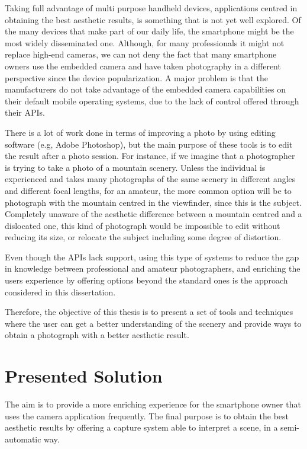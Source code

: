 Taking full advantage of multi purpose handheld devices, applications centred in obtaining the best aesthetic results, is something that is not yet well explored. 
Of the many devices that make part of our daily life, the smartphone might be the most widely disseminated one. Although, for many professionals it might not replace high-end cameras, we can not deny the fact that many smartphone owners use the embedded camera and have taken photography in a different perspective since the device popularization. A major problem is that the manufacturers do not take advantage of the embedded camera capabilities on their default mobile operating systems, due to the lack of control offered through their APIs.

There is a lot of work done in terms of improving a photo by using editing software (e.g, Adobe Photoshop), but the main purpose of these tools is to edit the result after a photo session. For instance, if we imagine that a photographer is trying to take a photo of a mountain scenery. Unless the individual is experienced and takes many photographs of the same scenery in different angles and different focal lengths, for an amateur, the more common option will be to photograph with the mountain centred in the viewfinder, since this is the subject. Completely unaware of the aesthetic difference between a mountain centred and a dislocated one, this kind of photograph would be impossible to edit without reducing its size, or relocate the subject including some degree of distortion.

Even though the APIs lack support, using this type of systems to reduce the gap in knowledge between professional and amateur photographers, and enriching the users experience by offering options beyond the standard ones is the approach considered in this dissertation.

Therefore, the objective of this thesis is to present a set of tools and techniques where the user can get a better understanding of the scenery and provide ways to obtain a photograph with a better aesthetic result.

\section{Presented Solution}
\label{sec:solution}

The aim is to provide a more enriching experience for the smartphone owner that uses the camera application frequently. The final purpose is to obtain the best aesthetic results by offering a capture system able to interpret a scene, in a semi-automatic way.


